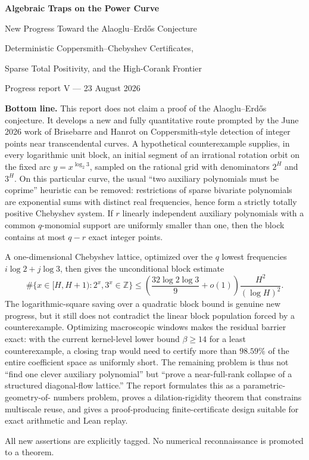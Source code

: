 \documentclass[11pt,oneside]{article}
\theoremstyle{definition}
\theoremstyle{remark}
\newcommand{\Z}{\mathbb Z}
\begin{document}

\begin{titlepage}
\centering
\vspace*{0.6cm}
{\Huge\bfseries Algebraic Traps on the Power Curve\par}
\vspace{0.35cm}
{\LARGE New Progress Toward the Alaoglu--Erd\H{o}s Conjecture\par}
\vspace{0.8cm}
{\Large Deterministic Coppersmith--Chebyshev Certificates,\par}
\vspace{0.12cm}
{\Large Sparse Total Positivity, and the High-Corank Frontier\par}
\vspace{1.0cm}
{\large Progress report V --- 23 August 2026\par}
\vfill
\begin{minipage}{0.92\textwidth}
\small
\textbf{Bottom line.}
This report does not claim a proof of the Alaoglu--Erd\H{o}s conjecture.  It develops a new
and fully quantitative route prompted by the June 2026 work of Brisebarre and Hanrot on
Coppersmith-style detection of integer points near transcendental curves.  A hypothetical
counterexample supplies, in every logarithmic unit block, an initial segment of an irrational
rotation orbit on the fixed arc $y=x^{\log_2 3}$, sampled on the rational grid with denominators
$2^H$ and $3^H$.  On this particular curve, the usual ``two auxiliary polynomials must be
coprime'' heuristic can be removed: restrictions of sparse bivariate polynomials are
exponential sums with distinct real frequencies, hence form a strictly totally positive
Chebyshev system.  If $r$ linearly independent auxiliary polynomials with a common $q$-monomial
support are uniformly smaller than one, then the block contains at most $q-r$ exact integer
points.

A one-dimensional Chebyshev lattice, optimized over the $q$ lowest frequencies
$i\log 2+j\log 3$, then gives the unconditional block estimate
\[
 \#\{x\in[H,H+1):2^x,3^x\in\Z\}
 \le \left(\frac{32\log2\log3}{9}+o(1)\right)
       \frac{H^2}{(\log H)^2}.
\]
The logarithmic-square saving over a quadratic block bound is genuine new progress, but it
still does not contradict the linear block population forced by a counterexample.  Optimizing
macroscopic windows makes the residual barrier exact: with the current kernel-level lower
bound $\beta\ge14$ for a least counterexample, a closing trap would need to certify more than
$98.59\%$ of the entire coefficient space as uniformly short.  The remaining problem is thus
not ``find one clever auxiliary polynomial'' but ``prove a near-full-rank collapse of a
structured diagonal-flow lattice.''  The report formulates this as a parametric-geometry-of-
numbers problem, proves a dilation-rigidity theorem that constrains multiscale reuse, and gives
a proof-producing finite-certificate design suitable for exact arithmetic and Lean replay.
\end{minipage}
\vfill
{\small All new assertions are explicitly tagged.  No numerical reconnaissance is promoted to a theorem.\par}
\end{titlepage}
\end{document}
